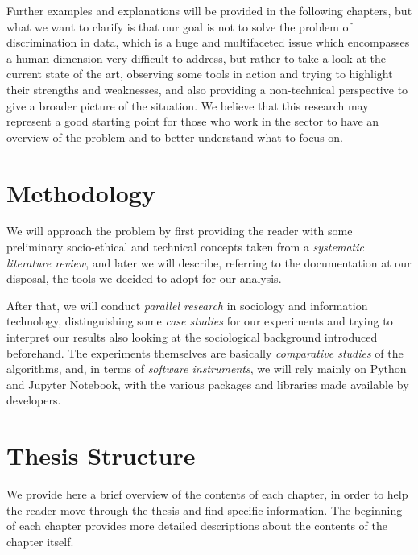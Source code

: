 Further examples and explanations will be provided in the following chapters, but what we want to clarify is that our goal is not to solve the problem of discrimination in data, which is a huge and multifaceted issue which encompasses a human dimension very difficult to address, but rather to take a look at the current state of the art, observing some tools in action and trying to highlight their strengths and weaknesses, and also providing a non-technical perspective to give a broader picture of the situation. We believe that this research may represent a good starting point for those who work in the sector to have an overview of the problem and to better understand what to focus on.


\section{Methodology}
We will approach the problem by first providing the reader with some preliminary socio-ethical and technical concepts taken from a \textit{systematic literature review}, and later we will describe, referring to the documentation at our disposal, the tools we decided to adopt for our analysis.

After that, we will conduct \textit{parallel research} in sociology and information technology, distinguishing some \textit{case studies} for our experiments and trying to interpret our results also looking at the sociological background introduced beforehand.
The experiments themselves are basically \textit{comparative studies} of the algorithms, and, in terms of \textit{software instruments}, we will rely mainly on Python and Jupyter Notebook, with the various packages and libraries made available by developers.


\section{Thesis Structure}
We provide here a brief overview of the contents of each chapter, in order to help the reader move through the thesis and find specific information. The beginning of each chapter provides more detailed descriptions about the contents of the chapter itself.

